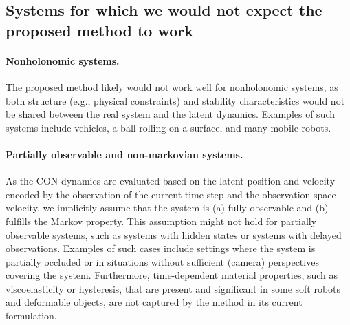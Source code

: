 \subsection{Systems for which we would not expect the proposed method to work}
\paragraph{Nonholonomic systems.}
The proposed method likely would not work well for nonholonomic systems, as both structure (e.g., physical constraints) and stability characteristics would not be shared between the real system and the latent dynamics. Examples of such systems include vehicles, a ball rolling on a surface, and many mobile robots.

\paragraph{Partially observable and non-markovian systems.}
As the CON dynamics are evaluated based on the latent position and velocity encoded by the observation of the current time step and the observation-space velocity, we implicitly assume that the system is (a) fully observable and (b) fulfills the Markov property. This assumption might not hold for partially observable systems, such as systems with hidden states or systems with delayed observations. Examples of such cases include settings where the system is partially occluded or in situations without sufficient (camera) perspectives covering the system. Furthermore, time-dependent material properties, such as viscoelasticity or hysteresis, that are present and significant in some soft robots and deformable objects, are not captured by the method in its current formulation.